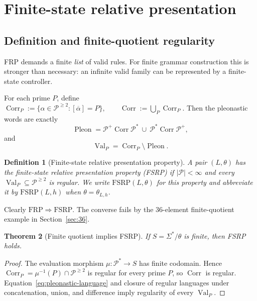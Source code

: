 \documentclass[11pt,a4paper]{article}
\newtheorem{theorem}{Theorem}[section]
\newtheorem{definition}[theorem]{Definition}
\newcommand{\Pcal}{\mathcal P}
\newcommand{\Val}{\operatorname{Val}}
\newcommand{\Corr}{\operatorname{Corr}}
\newcommand{\Pleon}{\operatorname{Pleon}}
\begin{document}
\section{Finite-state relative presentation}
\label{sec:fsrp}

\subsection{Definition and finite-quotient regularity}

FRP demands a finite \emph{list} of valid rules.  For finite grammar construction this is stronger than necessary: an infinite valid family can be represented by a finite-state controller.

For each prime $P$, define
\(\Corr_P:=\{\alpha\in\Pcal^{\ge2}:[\overline\alpha]=P\}, \qquad \Corr:=\bigcup_P\Corr_P.\)
Then the pleonastic words are exactly
\begin{equation}
  \Pleon
  =
  \Pcal^+\Corr\Pcal^*
  \ \cup\
  \Pcal^*\Corr\Pcal^+,
  \label{eq:pleonastic-language}
\end{equation}
and
\[
  \Val_P=\Corr_P\setminus\Pleon.
\]

\begin{definition}[Finite-state relative presentation property]
A pair $(L,\theta)$ has the \emph{finite-state relative presentation property} (FSRP) if $|\Pcal|<\infty$ and every $\Val_P\subseteq\Pcal^{\ge2}$ is regular.  We write $\mathrm{FSRP}(L,\theta)$ for this property and abbreviate it by $\mathrm{FSRP}(L,h)$ when $\theta=\theta_{L,h}$.
\end{definition}

Clearly
\(\mathrm{FRP}\Longrightarrow\mathrm{FSRP}.\)
The converse fails by the $36$-element finite-quotient example in Section~\ref{sec:36}.

\begin{theorem}[Finite quotient implies FSRP]
\label{thm:finite-quotient-fsrp}
If $S=\Sigma^*/\theta$ is finite, then FSRP holds.
\end{theorem}

\begin{proof}
The evaluation morphism
\(\mu:\Pcal^*\to S\)
has finite codomain.  Hence
\(\Corr_P=\mu^{-1}(P)\cap\Pcal^{\ge2}\)
is regular for every prime $P$, so $\Corr$ is regular.  Equation~\eqref{eq:pleonastic-language} and closure of regular languages under concatenation, union, and difference imply regularity of every $\Val_P$.
\end{proof}
\end{document}
